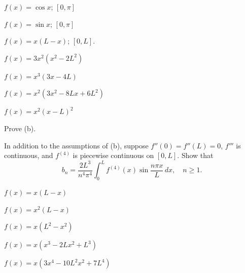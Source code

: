 \begin{exerciselist}
\item\label{exer:11.3.28}$f(x)=\cos x$;   \quad $[0,\pi]$

\item\label{exer:11.3.29}$f(x)=\sin x$;   \quad $[0,\pi]$




\item\label{exer:11.3.30}\Cex
$f(x)=x(L-x)$;  \quad $[0,L]$.



\item\label{exer:11.3.31}$f(x)=3x^2(x^2-2L^2)$

\item\label{exer:11.3.32}$f(x)=x^3(3x-4L)$

\item\label{exer:11.3.33}$f(x)=x^2(3x^2-8Lx+6L^2)$

\item\label{exer:11.3.34}$f(x)=x^2(x-L)^2$

\item\label{exer:11.3.35}\begin{alist}
\item %
Prove (b).
\item %
In addition to the assumptions of (b),
suppose  $f''(0)=f''(L)=0$, $f'''$ is continuous,  and $f^{(4)}$
is piecewise continuous on $[0,L]$.
Show that
\[
b_n=\frac{2L^3}{n^4\pi^4}\int_0^L f^{(4)}(x)\sin\frac{n\pi
x}{L}\,dx,
\quad n\ge1.
\]
\end{alist}


\item\label{exer:11.3.36}\Cex $f(x)=x(L-x)$

\item\label{exer:11.3.37}\Cex\quad$f(x)=x^2(L-x)$

\item\label{exer:11.3.38}$f(x)=x(L^2-x^2)$

\item\label{exer:11.3.39}$f(x)=x(x^3-2Lx^2+L^3)$

\item\label{exer:11.3.40}$f(x)=x(3x^4-10L^2x^2+7L^4)$


\end{exerciselist}
